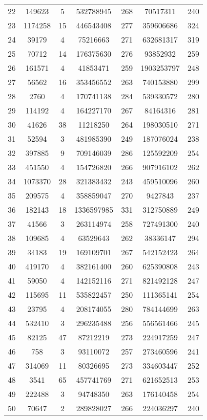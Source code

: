 \documentclass[tikz, 12pt]{scrartcl}
\begin{document}
\begin{longtable}{|c|cc|cc|cc|}
22	 &149623	 & 	5	 &532788945	 & 	268	 &70517311	 & 	240\\
23	 &1174258	 & 	15	 &446543408	 & 	277	 &359606686	 & 	324\\
24	 &39179	 & 	4	 &75216663	 & 	271	 &632681317	 & 	319\\
25	 &70712	 & 	14	 &176375630	 & 	276	 &93852932	 & 	259\\
26	 &161571	 & 	4	 &41853471	 & 	259	 &1903253797	 & 	248\\
27	 &56562	 & 	16	 &353456552	 & 	263	 &740153880	 & 	299\\
28	 &2760	 & 	4	 &170741138	 & 	284	 &539330572	 & 	280\\
29	 &114192	 & 	4	 &164227170	 & 	267	 &84164316	 & 	281\\
30	 &41626	 & 	38	 &11218250	 & 	264	 &198030510	 & 	271\\
31	 &52594	 & 	3	 &481985390	 & 	249	 &187076024	 & 	238\\
32	 &397885	 & 	9	 &709146039	 & 	286	 &125592209	 & 	254\\
33	 &451550	 & 	4	 &154726820	 & 	266	 &907916102	 & 	262\\
34	 &1073370	 & 	28	 &321383432	 & 	243	 &459510096	 & 	260\\
35	 &209575	 & 	4	 &358859047	 & 	270	 &9427843	 & 	237\\
36	 &182143	 & 	18	 &1336597985	 & 	331	 &312750889	 & 	249\\
37	 &41566	 & 	3	 &263114974	 & 	258	 &727491300	 & 	240\\
38	 &109685	 & 	4	 &63529643	 & 	262	 &38336147	 & 	294\\
39	 &34183	 & 	19	 &169109701	 & 	267	 &542152423	 & 	264\\
40	 &419170	 & 	4	 &382161400	 & 	260	 &625390808	 & 	243\\
41	 &59050	 & 	4	 &142152116	 & 	271	 &821492128	 & 	247\\
42	 &115695	 & 	11	 &535822457	 & 	250	 &111365141	 & 	254\\
43	 &23795	 & 	4	 &208174055	 & 	280	 &784144699	 & 	263\\
44	 &532410	 & 	3	 &296235488	 & 	256	 &556561466	 & 	245\\
45	 &82125	 & 	47	 &87212219	 & 	273	 &224917259	 & 	247\\
46	 &758	 & 	3	 &93110072	 & 	257	 &273460596	 & 	241\\
47	 &314069	 & 	11	 &80326695	 & 	273	 &334603447	 & 	252\\
48	 &3541	 & 	65	 &457741769	 & 	271	 &621652513	 & 	253\\
49	 &222488	 & 	3	 &94748350	 & 	263	 &176140458	 & 	254\\
50	 &70647	 & 	2	 &289828027	 & 	266	 &224036297	 & 	240\\
\hline
\end{longtable}
\end{document}
